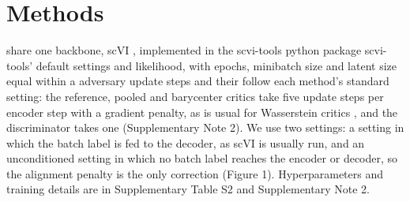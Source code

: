 \documentclass[10pt]{article}
\newcommand{\tbd}[1]{[\textit{to be decided: #1}]}
\begin{document}
\section{Methods}

\qquad {} share one backbone, scVI  \citep{lopez2018deep}, implemented in the scvi-tools python package  scvi-tools' default settings and likelihood, with epochs, minibatch size and latent size equal within a  adversary update steps and their  follow each method's standard setting: the reference, pooled and barycenter critics take five update steps per encoder step with a gradient penalty, as is usual for Wasserstein critics \citep{gulrajani2017improved}, and the discriminator takes one  (Supplementary Note 2). We use two settings: a  setting in which the batch label is fed to the decoder, as scVI is usually run, and an unconditioned setting in which no batch label reaches the encoder or decoder, so the alignment penalty is the only correction (Figure 1). Hyperparameters and training details are in Supplementary Table S2 and Supplementary Note 2.
\end{document}
